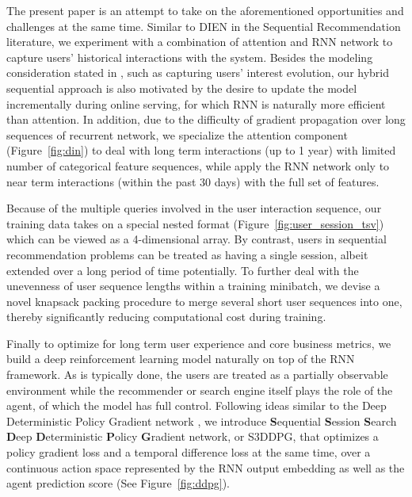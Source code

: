 The present paper is an attempt to take on the aforementioned opportunities and challenges at the same time. Similar to DIEN \cite{zhou2019deep} in the Sequential Recommendation literature, we experiment with a combination of attention and RNN network to capture users' historical interactions with the system. Besides the modeling consideration stated in \cite{zhou2019deep}, such as capturing users' interest evolution, our hybrid sequential approach is also motivated by the desire to update the model incrementally during online serving, for which RNN is naturally more efficient than attention. In addition, due to the difficulty of gradient propagation over long sequences of recurrent network,  we specialize the attention component (Figure~\ref{fig:din}) to deal with long term interactions (up to 1 year) with limited number of categorical feature sequences, while apply the RNN network only to near term interactions (within the past 30 days) with the full set of features. 

Because of the multiple queries involved in the user interaction sequence, our training data takes on a special nested format (Figure~\ref{fig:user_session_tsv}) which can be viewed as a 4-dimensional array. By contrast, users in sequential recommendation problems can be treated as having a single session, albeit extended over a long period of time potentially. To further deal with the unevenness of user sequence lengths within a training minibatch, we devise a novel knapsack packing procedure to merge several short user sequences into one, thereby significantly reducing computational cost during training.

Finally to optimize for long term user experience and core business metrics, we build a deep reinforcement learning model naturally on top of the RNN framework. As is typically done, the users are treated as a partially observable environment while the recommender or search engine itself plays the role of the agent, of which the model has full control. Following ideas similar to the Deep Deterministic Policy Gradient network \cite{lillicrap2015continuous}, we introduce \textbf{S}equential \textbf{S}ession \textbf{S}earch \textbf{D}eep \textbf{D}eterministic \textbf{P}olicy \textbf{G}radient network, or S3DDPG, that optimizes a policy gradient loss and a temporal difference loss at the same time, over a continuous action space represented by the RNN output embedding as well as the agent prediction score (See Figure~\ref{fig:ddpg}). 

